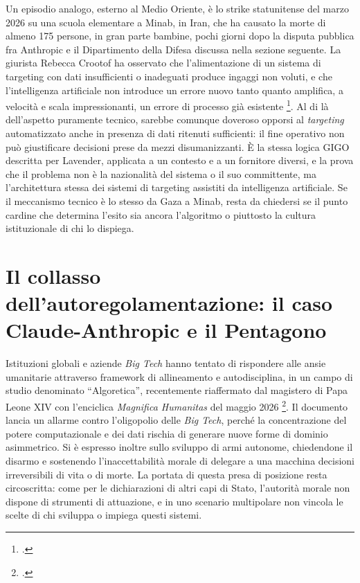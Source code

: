 \documentclass[a4paper,12pt]{report}
\begin{document}
Un episodio analogo, esterno al Medio Oriente, è lo strike statunitense del marzo
2026 su una scuola elementare a Minab, in Iran, che ha causato la morte di almeno
175 persone, in gran parte bambine, pochi giorni dopo la disputa pubblica fra
Anthropic e il Dipartimento della Difesa discussa nella sezione seguente. La
giurista Rebecca Crootof ha osservato che l'alimentazione di un sistema di
targeting con dati insufficienti o inadeguati produce ingaggi non voluti, e che
l'intelligenza artificiale non introduce un errore nuovo tanto quanto amplifica,
a velocità e scala impressionanti, un errore di processo già esistente
\footcite{crootof_2026}. Al di là dell'aspetto puramente tecnico, sarebbe
comunque doveroso opporsi al \textit{targeting} automatizzato anche in presenza
di dati ritenuti sufficienti: il fine operativo non può giustificare decisioni
prese da mezzi disumanizzanti. È la stessa logica GIGO descritta per Lavender,
applicata a un contesto e a un fornitore diversi, e la prova che il problema non
è la nazionalità del sistema o il suo committente, ma l'architettura stessa dei
sistemi di targeting assistiti da intelligenza artificiale. Se il meccanismo
tecnico è lo stesso da Gaza a Minab, resta da chiedersi se il punto cardine che
determina l'esito sia ancora l'algoritmo o piuttosto la cultura istituzionale di
chi lo dispiega.

\section{Il collasso dell'autoregolamentazione: il caso Claude-Anthropic e il Pentagono}
\label{sec:governance}

Istituzioni globali e aziende \textit{Big Tech} hanno tentato di rispondere alle
ansie umanitarie attraverso framework di allineamento e autodisciplina, in un
campo di studio denominato ``Algoretica'', recentemente riaffermato dal magistero
di Papa Leone XIV con l'enciclica \textit{Magnifica Humanitas} del maggio 2026
\footcite{enciclica_2026}. Il documento lancia un allarme contro l'oligopolio
delle \textit{Big Tech}, perché la concentrazione del potere computazionale e dei
dati rischia di generare nuove forme di dominio asimmetrico. Si è espresso inoltre sullo sviluppo di armi autonome, chiedendone il disarmo e
sostenendo l'inaccettabilità morale di delegare a una macchina decisioni
irreversibili di vita o di morte. La portata di questa presa di posizione resta
circoscritta: come per le dichiarazioni di altri capi di Stato, l'autorità
morale non dispone di strumenti di attuazione, e in uno scenario multipolare non
vincola le scelte di chi sviluppa o impiega questi sistemi.
\end{document}
